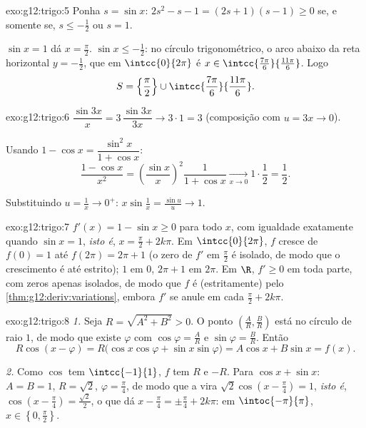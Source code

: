 \begin{solution}{exo:g12:trigo:5}
Ponha $s = \sin x$: $2s^2 - s - 1 = (2s + 1)(s - 1) \geq 0$ se, e somente
se, $s \leq -\frac12$ ou $s = 1$.

$\sin x = 1$ dá $x = \frac\pi2$. $\sin x \leq -\frac12$: no círculo
trigonométrico, o arco abaixo da reta horizontal $y = -\frac12$, que em
$\intcc{0}{2\pi}$ é $x \in \intcc{\frac{7\pi}{6}}{\frac{11\pi}{6}}$.
Logo
\[
S = \left\{\frac{\pi}{2}\right\} \cup
\intcc{\frac{7\pi}{6}}{\frac{11\pi}{6}} .
\]
\end{solution}

\begin{solution}{exo:g12:trigo:6}
$\dfrac{\sin 3x}{x} = 3\,\dfrac{\sin 3x}{3x} \to 3 \cdot 1 = 3$
(composição com $u = 3x \to 0$).

Usando $1 - \cos x = \dfrac{\sin^2 x}{1 + \cos x}$:
\[
\frac{1 - \cos x}{x^2}
= \left(\frac{\sin x}{x}\right)^{\!2} \frac{1}{1 + \cos x}
\xrightarrow[x\to0]{} 1 \cdot \frac12 = \frac12 .
\]

Substituindo $u = \frac1x \to 0^+$:
$x \sin\frac1x = \frac{\sin u}{u} \to 1$.
\end{solution}

\begin{solution}{exo:g12:trigo:7}
$f'(x) = 1 - \sin x \geq 0$ para todo $x$, com igualdade exatamente quando
$\sin x = 1$, \emph{isto é}, $x = \frac\pi2 + 2k\pi$. Em
$\intcc{0}{2\pi}$, $f$ cresce de $f(0) = 1$ até $f(2\pi) = 2\pi + 1$ (o
zero de $f'$ em $\frac{\pi}{2}$ é isolado, de modo que o crescimento é até
estrito);  $1$ em $0$,  $2\pi + 1$ em $2\pi$. Em $\R$,
$f' \geq 0$ em toda parte, com zeros apenas isolados, de modo que $f$ é
(estritamente)  pelo \cref{thm:g12:deriv:variations}, embora $f'$
se anule em cada $\frac\pi2 + 2k\pi$.
\end{solution}

\begin{solution}{exo:g12:trigo:8}
\emph{1.} Seja $R = \sqrt{A^2 + B^2} > 0$. O ponto
$\left(\frac AR, \frac BR\right)$ está no círculo de raio $1$, de modo que
existe $\varphi$ com $\cos\varphi = \frac AR$ e $\sin\varphi = \frac BR$.
Então
\[
R\cos(x - \varphi) = R\bigl(\cos x\cos\varphi + \sin x \sin\varphi\bigr)
= A\cos x + B\sin x = f(x).
\]

\emph{2.} Como $\cos$ tem  $\intcc{-1}{1}$, $f$ tem  $R$ e
 $-R$. Para $\cos x + \sin x$: $A = B = 1$, $R = \sqrt2$,
$\varphi = \frac\pi4$, de modo que a  vira
$\sqrt2\cos\left(x - \frac\pi4\right) = 1$, \emph{isto é},
$\cos\left(x - \frac\pi4\right) = \frac{\sqrt2}{2}$, o que dá
$x - \frac\pi4 = \pm\frac\pi4 + 2k\pi$: em $\intoc{-\pi}{\pi}$,
$x \in \left\{0, \frac\pi2\right\}$.
\end{solution}

